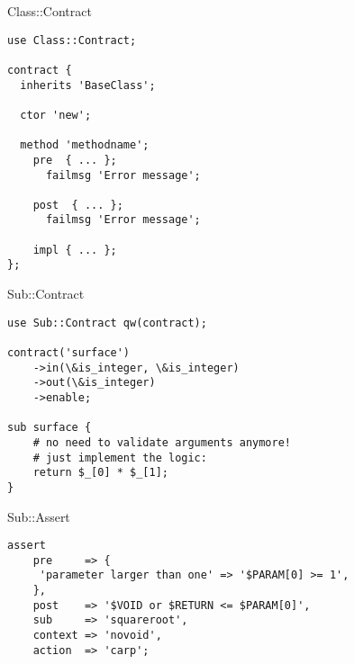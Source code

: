 \documentclass[14pt]{beamer}
\begin{document}
\begin{frame}
    \begin{center}
        Class::Contract
    \end{center}
\end{frame}

\begin{frame}[fragile]
    \begin{lstlisting}
use Class::Contract;

contract {
  inherits 'BaseClass';

  ctor 'new';

  method 'methodname';
    pre  { ... };
      failmsg 'Error message';

    post  { ... };
      failmsg 'Error message';

    impl { ... };
};
    \end{lstlisting}
\end{frame}

\begin{frame}
    \begin{center}
        Sub::Contract
    \end{center}
\end{frame}

\begin{frame}[fragile]
    \begin{lstlisting}
use Sub::Contract qw(contract);

contract('surface')
    ->in(\&is_integer, \&is_integer)
    ->out(\&is_integer)
    ->enable;

sub surface {
    # no need to validate arguments anymore!
    # just implement the logic:
    return $_[0] * $_[1];
}
    \end{lstlisting}
\end{frame}

\begin{frame}
    \begin{center}
        Sub::Assert
    \end{center}
\end{frame}

\begin{frame}[fragile]
    \begin{lstlisting}
assert
    pre     => {
     'parameter larger than one' => '$PARAM[0] >= 1',
    },
    post    => '$VOID or $RETURN <= $PARAM[0]',
    sub     => 'squareroot',
    context => 'novoid',
    action  => 'carp';
    \end{lstlisting}
\end{frame}
\end{document}
